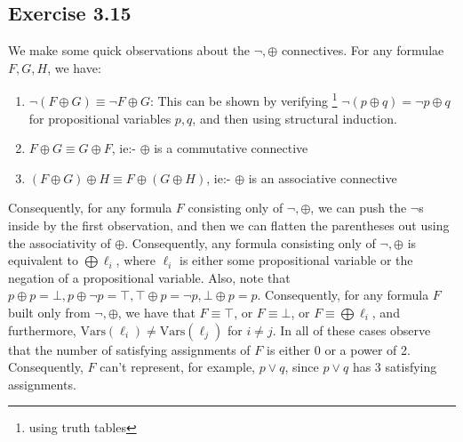 \documentclass{article}
\newcommand{\Vars}{\mathrm{Vars}}
\begin{document}
\subsection*{Exercise 3.15}
We make some quick observations about the $\lnot, \oplus$ connectives. For any formulae $F, G, H$, we have:
\begin{enumerate}
    \item $\lnot(F\oplus G) \equiv \lnot F\oplus G$: This can be shown by verifying \footnote{using truth tables} $\lnot(p\oplus q) = \lnot p\oplus q$ for propositional variables $p, q$, and then using structural induction.
    \item $F\oplus G\equiv G\oplus F$, ie:- $\oplus$ is a commutative connective
    \item $(F\oplus G)\oplus H \equiv F\oplus (G\oplus H)$, ie:- $\oplus$ is an associative connective
\end{enumerate}
Consequently, for any formula $F$ consisting only of $\lnot, \oplus$, we can push the $\lnot$s inside by the first observation, and then we can flatten the parentheses out using the associativity of $\oplus$. Consequently, any formula consisting only of $\lnot, \oplus$ is equivalent to $\bigoplus\ell_i$, where $\ell_i$ is either some propositional variable or the negation of a propositional variable. Also, note that $p\oplus p = \bot, p\oplus\lnot p = \top, \top\oplus p = \lnot p, \bot\oplus p = p$. Consequently, for any formula $F$ built only from $\lnot, \oplus$, we have that $F\equiv\top$, or $F\equiv\bot$, or $F\equiv\bigoplus\ell_i$, and furthermore, $\Vars(\ell_i)\neq\Vars(\ell_j)$ for $i\neq j$. In all of these cases observe that the number of satisfying assignments of $F$ is either $0$ or a power of 2. Consequently, $F$ can't represent, for example, $p\lor q$, since $p\lor q$ has 3 satisfying assignments.
\end{document}
